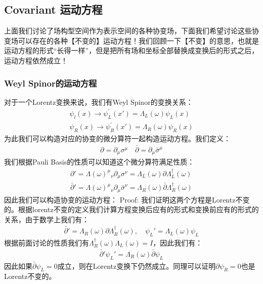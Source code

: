 \subsection{Covariant 运动方程}

上面我们讨论了场构型空间作为表示空间的各种协变场，下面我们希望讨论这些协变场可以存在的各种【不变的】运动方程！我们回顾一下【不变】的意思，也就是运动方程的形式“长得一样”，但是把所有场和坐标全部替换成变换后的形式之后，运动方程依然成立！

\subsubsection{Weyl Spinor的运动方程}


对于一个Lorentz变换来说，我们有Weyl Spinor的变换关系：
\begin{align}
  \psi_l(x) \to \psi_L^{\prime}(x')=\Lambda_L(\omega)\psi_L(x) \\
  \psi_R(x) \to \psi_R^{\prime}(x')=\Lambda_R(\omega)\psi_R(x)
\end{align}
为此我们可以构造对应的协变的微分算符一起构造运动方程。我们定义：
\begin{align}
  \partial = \partial_\mu \sigma^\mu \quad \bar{\partial} =
  \partial_\mu \bar{\sigma}^\mu
\end{align}
我们根据Pauli Basis的性质可以知道这个微分算符满足性质：
\begin{align}
  \partial'  = \Lambda(\omega)^\mu{}_\nu \partial_\mu \sigma^\nu=
  \Lambda_L(\omega) \partial \Lambda_L^\dagger(\omega) \\
  \bar{\partial}' = \Lambda(\omega)^\mu{}_\nu \partial_\mu
  \bar{\sigma}^\nu = \Lambda_R(\omega) \bar{\partial} \Lambda_R^\dagger(\omega)
\end{align}
因此我们可以构造协变的运动方程：
Proof: 我们证明这两个方程是Lorentz不变的。根据lorentz不变的定义我们计算方程变换后应有的形式和变换前应有的形式的关系，由于数学上我们有：
\begin{align}
  \bar{\partial}' = \Lambda_R(\omega) \partial
  \Lambda_R^\dagger(\omega), \quad \psi_L' = \Lambda_L(\omega) \psi_L
\end{align}
根据前面讨论的性质我们有$ \Lambda_R^\dagger(\omega)\Lambda_L(\omega) = I $，因此我们有：
\begin{align}
  \bar{\partial}'\psi_L'  = \Lambda_R(\omega) \bar{\partial} \psi_L
\end{align}
因此如果$ \bar{\partial}\psi_L = 0 $成立，则在Lorentz变换下仍然成立。同理可以证明$ \partial
\psi_R = 0 $也是Lorentz不变的。

